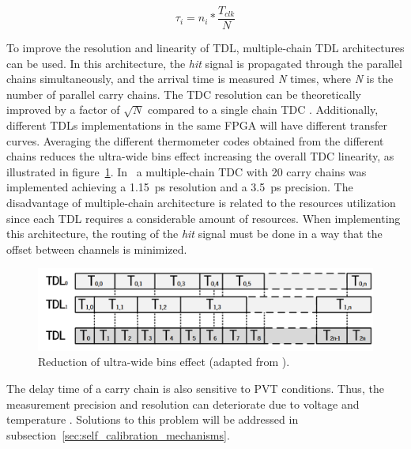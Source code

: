 \begin{equation}
	\tau_{i} = n_{i} * \frac{T_{clk}}{N}
	\label{eq:cell_delay}
\end{equation}

To improve the resolution and linearity of \gls{TDL}, multiple-chain \gls{TDL} architectures can be used. In this architecture, the \textit{hit} signal is propagated through the parallel chains simultaneously, and the arrival time is measured \textit{N} times, where \textit{N} is the number of parallel carry chains. The \gls{TDC} resolution can be theoretically improved by a factor of $\sqrt{N}$ compared to a single chain \gls{TDC} \citep{pvt_mc}. Additionally, different \glspl{TDL} implementations in the same \gls{FPGA} will have different transfer curves. Averaging the different thermometer codes obtained from the different chains reduces the ultra-wide bins effect increasing the overall \gls{TDC} linearity, as illustrated in figure~\ref{fig:multiple_chain_td}. In~\citep{pvt_offset} a multiple-chain \gls{TDC} with 20 carry chains was implemented achieving a 1.15~ps resolution and a 3.5~ps precision. The disadvantage of multiple-chain architecture is related to the resources utilization since each \gls{TDL} requires a considerable amount of resources. When implementing this architecture, the routing of the \textit{hit} signal must be done in a way that the offset between channels is minimized.

\begin{figure}[ht!]
	\centering
	\includegraphics[width=.7\textwidth]{img/02_StateofArt/ultrawide_bin.png}
	\caption{Reduction of ultra-wide bins effect (adapted from \citep{tdl_hyb_1.9}).}
	\label{fig:multiple_chain_td}
\end{figure}

The delay time of a carry chain is also sensitive to \gls{PVT} conditions. Thus, the measurement precision and resolution can deteriorate due to voltage and temperature \citep{pvt_offset}. Solutions to this problem will be addressed in subsection~\ref{sec:self_calibration_mechanisms}.


